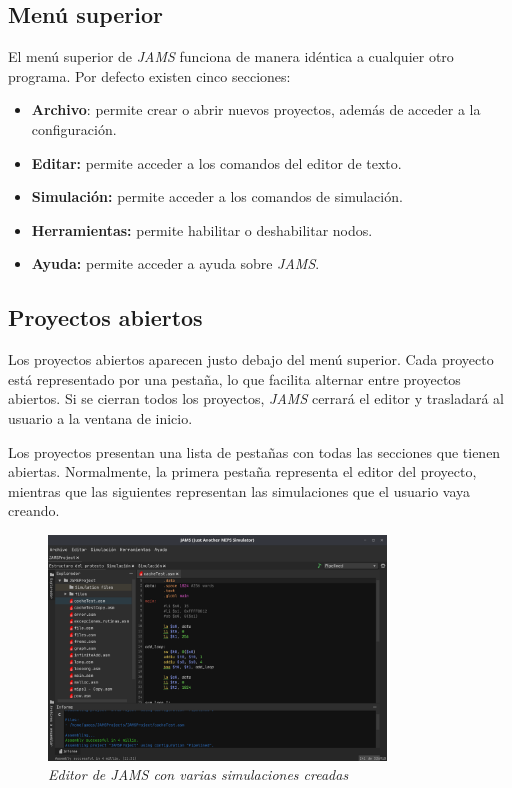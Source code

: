 \subsection{Menú superior}\label{subsec:menu-superior}

El menú superior de \textit{JAMS} funciona de manera idéntica
a cualquier otro programa.
Por defecto existen cinco secciones:
\begin{itemize}
    \item \textbf{Archivo}: permite crear o abrir nuevos proyectos, además de
    acceder a la configuración.
    \item \textbf{Editar:} permite acceder a los comandos del editor de texto.
    \item \textbf{Simulación:} permite acceder a los comandos de simulación.
    \item \textbf{Herramientas:} permite habilitar o deshabilitar nodos.
    \item \textbf{Ayuda:} permite acceder a ayuda sobre \textit{JAMS}.
\end{itemize}

\subsection{Proyectos abiertos}\label{subsec:proyectos-abiertos}

Los proyectos abiertos aparecen justo debajo del menú superior.
Cada proyecto está representado por una pestaña, lo que facilita alternar entre
proyectos abiertos.
Si se cierran todos los proyectos, \textit{JAMS} cerrará el editor y trasladará
al usuario a la ventana de inicio.

Los proyectos presentan una lista de pestañas con todas las secciones
que tienen abiertas.
Normalmente, la primera pestaña representa el editor del proyecto, mientras que
las siguientes representan las simulaciones que el usuario vaya creando.

\begin{figure}[H]
    \centering
    \includegraphics[width=0.8\textwidth]{images/base/jams-sections}
    \caption{\textit{Editor de \textit{JAMS} con varias simulaciones creadas}}
    \label{fig:jams-sections}
\end{figure}

